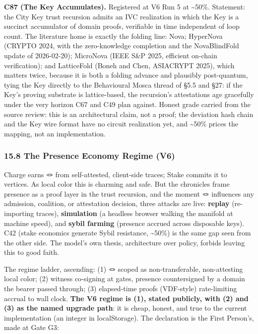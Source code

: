 \documentclass[
]{article}
\begin{document}
\textbf{C87 (The Key Accumulates).} Registered at V6 Run 5 at
\textasciitilde50\%. Statement: the City Key trust recursion admits an
IVC realization in which the Key is a succinct accumulator of domain
proofs, verifiable in time independent of loop count. The literature
home is exactly the folding line: Nova; HyperNova (CRYPTO 2024, with the
zero-knowledge completion and the NovaBlindFold update of 2026-02-20);
MicroNova (IEEE S\&P 2025, efficient on-chain verification); and
LatticeFold (Boneh and Chen, ASIACRYPT 2025), which matters twice,
because it is both a folding advance and plausibly post-quantum, tying
the Key directly to the Behavioural Mosca thread of §5.5 and §27: if the
Key's proving substrate is lattice-based, the recursion's attestations
age gracefully under the very horizon C67 and C49 plan against. Honest
grade carried from the source review: this is an architectural claim,
not a proof; the deviation hash chain and the Key wire format have no
circuit realization yet, and \textasciitilde50\% prices the mapping, not
an implementation.

\subsubsection{15.8 The Presence Economy Regime
(V6)}\label{the-presence-economy-regime-v6}

Charge earns 🪢 from self-attested, client-side traces; Stake commits it
to vertices. As local color this is charming and safe. But the
chronicles frame presence as a proof layer in the trust recursion, and
the moment 🪢 influences any admission, coalition, or attestation
decision, three attacks are live: \textbf{replay} (re-importing traces),
\textbf{simulation} (a headless browser walking the manifold at machine
speed), and \textbf{sybil farming} (presence accrued across disposable
keys). C42 (stake economics generate Sybil resistance,
\textasciitilde50\%) is the same gap seen from the other side. The
model's own thesis, architecture over policy, forbids leaving this to
good faith.

The regime ladder, ascending: (1) 🪢 scoped as non-transferable,
non-attesting local color; (2) witness co-signing at gates, presence
countersigned by a domain the bearer passed through; (3) elapsed-time
proofs (VDF-style) rate-limiting accrual to wall clock. \textbf{The V6
regime is (1), stated publicly, with (2) and (3) as the named upgrade
path}: it is cheap, honest, and true to the current implementation (an
integer in localStorage). The declaration is the First Person's, made at
Gate G3:
\end{document}
